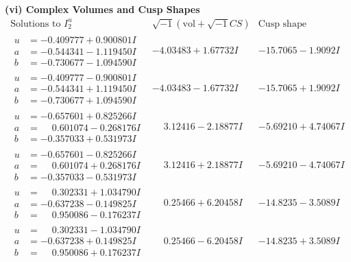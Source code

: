 \documentclass[1p]{elsarticle_modified}
\theoremstyle{definition}
\newcommand{\I}{\sqrt{-1}}
\begin{document}
\newpage\flushleft \textbf{(vi) Complex Volumes and Cusp Shapes}
$$\begin{array}{c|c|c}  
\text{Solutions to }I^u_{2}& \I (\text{vol} + \sqrt{-1}CS) & \text{Cusp shape}\\
 \hline 
\begin{aligned}
u &= -0.409777 + 0.900801 I \\
a &= -0.544341 - 1.119450 I \\
b &= -0.730677 - 1.094590 I\end{aligned}
 & -4.03483 + 1.67732 I & -15.7065 - 1.9092 I \\ \hline\begin{aligned}
u &= -0.409777 - 0.900801 I \\
a &= -0.544341 + 1.119450 I \\
b &= -0.730677 + 1.094590 I\end{aligned}
 & -4.03483 - 1.67732 I & -15.7065 + 1.9092 I \\ \hline\begin{aligned}
u &= -0.657601 + 0.825266 I \\
a &= \phantom{-}0.601074 - 0.268176 I \\
b &= -0.357033 + 0.531973 I\end{aligned}
 & \phantom{-}3.12416 - 2.18877 I & -5.69210 + 4.74067 I \\ \hline\begin{aligned}
u &= -0.657601 - 0.825266 I \\
a &= \phantom{-}0.601074 + 0.268176 I \\
b &= -0.357033 - 0.531973 I\end{aligned}
 & \phantom{-}3.12416 + 2.18877 I & -5.69210 - 4.74067 I \\ \hline\begin{aligned}
u &= \phantom{-}0.302331 + 1.034790 I \\
a &= -0.637238 - 0.149825 I \\
b &= \phantom{-}0.950086 - 0.176237 I\end{aligned}
 & \phantom{-}0.25466 + 6.20458 I & -14.8235 - 3.5089 I \\ \hline\begin{aligned}
u &= \phantom{-}0.302331 - 1.034790 I \\
a &= -0.637238 + 0.149825 I \\
b &= \phantom{-}0.950086 + 0.176237 I\end{aligned}
 & \phantom{-}0.25466 - 6.20458 I & -14.8235 + 3.5089 I \\ \hline\begin{aligned}

\end{aligned}
\end{array}$$
\end{document}
